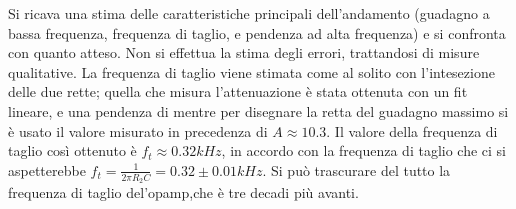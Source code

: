 \documentclass[10pt,a4paper]{article}
\begin{document}
	Si ricava una stima delle caratteristiche principali dell'andamento (guadagno a bassa frequenza, frequenza di taglio, e pendenza ad alta frequenza)
	e si confronta con quanto atteso. Non si effettua la stima degli errori, trattandosi di misure qualitative.
	La frequenza di taglio viene stimata come al solito con l'intesezione delle due rette; quella che misura l'attenuazione è stata ottenuta con un fit lineare, e una pendenza di mentre per disegnare la retta del guadagno massimo si è usato il valore misurato in precedenza di $A\approx10.3$. Il valore della frequenza di taglio così ottenuto è $f_t\approx0.32 kHz$, in accordo con la frequenza di taglio che ci si aspetterebbe $f_t=\frac{1}{2\pi R_2C}=0.32\pm0.01 kHz$. Si può trascurare del tutto la frequenza di taglio del'opamp,che è tre decadi più avanti.
	
	
\end{document}
